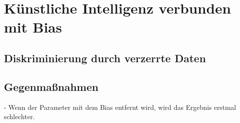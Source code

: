     \section{Künstliche Intelligenz verbunden mit Bias}
    \label{subsec:KIundbias}

    \subsection{Diskriminierung durch verzerrte Daten}
    \label{subsubsec:diskriminierungdurchverzerrung}

    \subsection{Gegenma{\ss}nahmen}
    \label{subsubsec:gegenmassnahmen}
    -   Wenn der Parameter mit dem Bias entfernt wird, wird das Ergebnis erstmal schlechter. \\

   \newpage